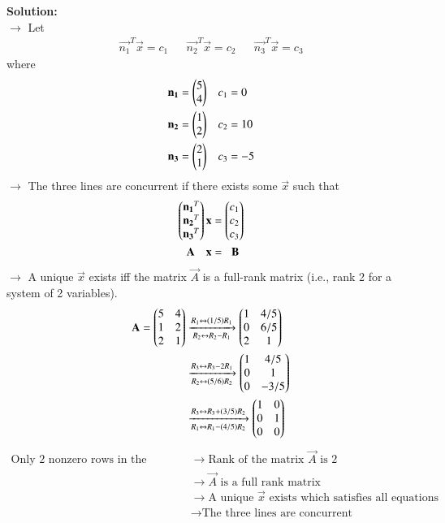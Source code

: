 \documentclass[journal]{IEEEtran}
\begin{document}
\textbf{Solution:}\\
$\rightarrow$ Let
\begin{align*}
    \vec{n_1}^T\vec{x} = c_1 && \vec{n_2}^T\vec{x} = c_2 && \vec{n_3}^T\vec{x} = c_3
\end{align*}
\hspace{0.3cm} where
\begin{align}
    \mathbf{n_1} = \begin{pmatrix}5\\4\end{pmatrix} && c_1 &= 0 \\
    \mathbf{n_2} = \begin{pmatrix}1\\2\end{pmatrix} && c_2 &= 10 \\
    \mathbf{n_3} = \begin{pmatrix}2\\1\end{pmatrix} && c_3 &= -5
\end{align}
$\rightarrow$ The three lines are concurrent if there exists some $\vec{x}$ such that
\begin{align}
    \begin{pmatrix}\mathbf{n_1}^T\\\mathbf{n_2}^T\\\mathbf{n_3}^T\end{pmatrix} \mathbf{x} &= \begin{pmatrix}c_1\\c_2\\c_3\end{pmatrix} \\
    \mathbf{A}\hspace{0.35cm}\mathbf{x} &= \hspace{0.2cm}\mathbf{B}
\end{align}
$\rightarrow$ A unique $\vec{x}$ exists iff the matrix $\vec{A}$ is a full-rank matrix (i.e., rank 2 for a system of 2 variables).
\begin{align}
    \mathbf{A} = \begin{pmatrix}5&4\\1&2\\2&1\end{pmatrix}
    &\xrightarrow[R_2 \leftrightarrow R_2 - R_1]{R_1 \leftrightarrow (1/5)R_1} \begin{pmatrix}1&4/5\\0&6/5\\2&1\end{pmatrix}\\
    &\xrightarrow[R_2 \leftrightarrow (5/6)R_2]{R_3 \leftrightarrow R_3 - 2R_1} \begin{pmatrix}1&4/5\\0&1\\0&-3/5\end{pmatrix}\\
    &\xrightarrow[R_1 \leftrightarrow R_1 - (4/5)R_2]{R_3 \leftrightarrow R_3 + (3/5)R_2} \begin{pmatrix}1&0\\0&1\\0&0\end{pmatrix}
\end{align}
\begin{align*}
    \text{Only 2 nonzero rows in the matrix in (8)}
    &\longrightarrow \text{Rank of the matrix $\vec{A}$ is 2} \\
    &\longrightarrow \text{$\vec{A}$ is a full rank matrix} \\
    &\longrightarrow \text{A unique $\vec{x}$ exists which satisfies all equations} \\
    &\longrightarrow \text{The three lines are concurrent}
\end{align*}
\end{document}
